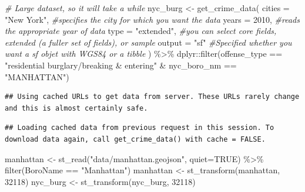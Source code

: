 \documentclass[
  krantz2]{krantz}
\makeatletter
\newenvironment{Shaded}{\begin{snugshade}}{\end{snugshade}}
\newcommand{\AttributeTok}[1]{\textcolor[rgb]{0.61,0.61,0.61}{#1}}
\newcommand{\CommentTok}[1]{\textcolor[rgb]{0.37,0.37,0.37}{\textit{#1}}}
\newcommand{\ConstantTok}[1]{\textcolor[rgb]{0,0,0}{#1}}
\newcommand{\DecValTok}[1]{\textcolor[rgb]{0.06,0.06,0.06}{#1}}
\newcommand{\FunctionTok}[1]{\textcolor[rgb]{0,0,0}{#1}}
\newcommand{\NormalTok}[1]{#1}
\newcommand{\OtherTok}[1]{\textcolor[rgb]{0.37,0.37,0.37}{#1}}
\newcommand{\SpecialCharTok}[1]{\textcolor[rgb]{0,0,0}{#1}}
\newcommand{\StringTok}[1]{\textcolor[rgb]{0.5,0.5,0.5}{#1}}
\newenvironment{kframe}{%
\medskip{}
\setlength{\fboxsep}{.8em}
 \def\at@end@of@kframe{}%
 \ifinner\ifhmode%
  \def\at@end@of@kframe{\end{minipage}}%
  \begin{minipage}{\columnwidth}%
 \fi\fi%
 \def\FrameCommand##1{\hskip\@totalleftmargin \hskip-\fboxsep
 \colorbox{shadecolor}{##1}\hskip-\fboxsep
     \hskip-\linewidth \hskip-\@totalleftmargin \hskip\columnwidth}%
 \MakeFramed {\advance\hsize-\width
   \@totalleftmargin\z@ \linewidth\hsize
   \@setminipage}}%
 {\par\unskip\endMakeFramed%
 \at@end@of@kframe}
\renewenvironment{Shaded}{\begin{kframe}}{\end{kframe}}
\makeatother
\begin{document}
\begin{Shaded}
\begin{Highlighting}[]
\CommentTok{\# Large dataset, so it will take a while}
\NormalTok{nyc\_burg }\OtherTok{\textless{}{-}} \FunctionTok{get\_crime\_data}\NormalTok{(}
  \AttributeTok{cities =} \StringTok{"New York"}\NormalTok{, }\CommentTok{\#specifies the city for which you want the data}
  \AttributeTok{years =} \DecValTok{2010}\NormalTok{,        }\CommentTok{\#reads the appropriate year of data}
  \AttributeTok{type =} \StringTok{"extended"}\NormalTok{,   }\CommentTok{\#you can select core fields, extended (a fuller set of                          fields), or sample}
  \AttributeTok{output =} \StringTok{"sf"}        \CommentTok{\#Specified whether you want a sf objet with WGS84 or a                          tibble}
\NormalTok{) }\SpecialCharTok{\%\textgreater{}\%}
\NormalTok{  dplyr}\SpecialCharTok{::}\FunctionTok{filter}\NormalTok{(offense\_type }\SpecialCharTok{==} \StringTok{"residential burglary/breaking \& entering"} \SpecialCharTok{\&}
\NormalTok{           nyc\_boro\_nm }\SpecialCharTok{==} \StringTok{"MANHATTAN"}\NormalTok{)}
\end{Highlighting}
\end{Shaded}

\begin{verbatim}
## Using cached URLs to get data from server. These URLs rarely change and this is almost certainly safe.
\end{verbatim}

\begin{verbatim}
## Loading cached data from previous request in this session. To download data again, call get_crime_data() with cache = FALSE.
\end{verbatim}

\begin{Shaded}
\begin{Highlighting}[]
\NormalTok{manhattan }\OtherTok{\textless{}{-}} \FunctionTok{st\_read}\NormalTok{(}\StringTok{"data/manhattan.geojson"}\NormalTok{, }\AttributeTok{quiet=}\ConstantTok{TRUE}\NormalTok{) }\SpecialCharTok{\%\textgreater{}\%}
  \FunctionTok{filter}\NormalTok{(BoroName }\SpecialCharTok{==} \StringTok{"Manhattan"}\NormalTok{)}
\NormalTok{manhattan }\OtherTok{\textless{}{-}} \FunctionTok{st\_transform}\NormalTok{(manhattan, }\DecValTok{32118}\NormalTok{)}
\NormalTok{nyc\_burg }\OtherTok{\textless{}{-}} \FunctionTok{st\_transform}\NormalTok{(nyc\_burg, }\DecValTok{32118}\NormalTok{)}
\end{Highlighting}
\end{Shaded}
\end{document}
